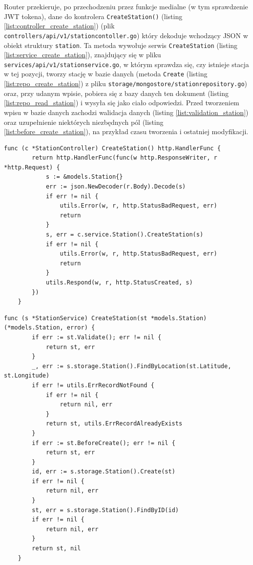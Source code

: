 Router przekieruje, po przechodzeniu przez funkcje medialne (w tym sprawdzenie JWT tokena), dane do kontrolera \texttt{CreateStation()} (listing \ref{list:controller_create_station}) (plik \texttt{controllers/api/v1/stationcontoller.go}) który dekoduje wchodzący JSON w obiekt struktury \texttt{station}.
Ta metoda wywołuje serwis \texttt{CreateStation} (listing \ref{list:service_create_station}), znajdujący się w pliku \texttt{services/api/v1/stationservice.go}, w którym sprawdza się, czy istnieje stacja w tej pozycji, tworzy stację w bazie danych (metoda \texttt{Create} (listing \ref{list:repo_create_station}) z pliku \texttt{storage/mongostore/stationrepository.go}) oraz, przy udanym wpisie, pobiera się z bazy danych ten dokument (listing \ref{list:repo_read_station}) i wysyła się jako ciało odpowiedzi.
Przed tworzeniem wpisu w bazie danych zachodzi walidacja danych (listing \ref{list:validation_station}) oraz uzupełnienie niektórych niezbędnych pól (listing \ref{list:before_create_station}), na przykład czasu tworzenia i ostatniej modyfikacji.
\begin{lstlisting}[label=list:controller_create_station,caption=Kontroler tworzenia stacji ładowniczej,basicstyle=\tiny\ttfamily]
    func (c *StationController) CreateStation() http.HandlerFunc {
        return http.HandlerFunc(func(w http.ResponseWriter, r *http.Request) {
            s := &models.Station{}
            err := json.NewDecoder(r.Body).Decode(s)
            if err != nil {
                utils.Error(w, r, http.StatusBadRequest, err)
                return
            }
            s, err = c.service.Station().CreateStation(s)
            if err != nil {
                utils.Error(w, r, http.StatusBadRequest, err)
                return
            }
            utils.Respond(w, r, http.StatusCreated, s)
        })
    }
\end{lstlisting}

\begin{lstlisting}[label=list:service_create_station,caption=Serwis tworzenia stacji ładowniczej,basicstyle=\tiny\ttfamily]
    func (s *StationService) CreateStation(st *models.Station) (*models.Station, error) {
        if err := st.Validate(); err != nil {
            return st, err
        }
        _, err := s.storage.Station().FindByLocation(st.Latitude, st.Longitude)
        if err != utils.ErrRecordNotFound {
            if err != nil {
                return nil, err
            }
            return st, utils.ErrRecordAlreadyExists
        }
        if err := st.BeforeCreate(); err != nil {
            return st, err
        }
        id, err := s.storage.Station().Create(st)
        if err != nil {
            return nil, err
        }
        st, err = s.storage.Station().FindByID(id)
        if err != nil {
            return nil, err
        }
        return st, nil
    }
\end{lstlisting}

